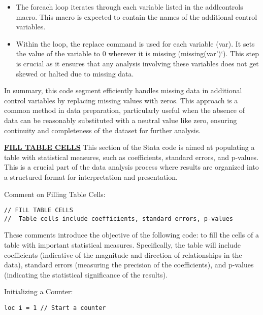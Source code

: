 \documentclass{article}
\begin{document}
\begin{itemize}
    \item 	The foreach loop iterates through each variable listed in the addlcontrols macro. This macro is expected to contain the names of the additional control variables.
    \item Within the loop, the replace command is used for each variable (var). It sets the value of the variable to 0 wherever it is missing (missing(var')`). This step is crucial as it ensures that any analysis involving these variables does not get skewed or halted due to missing data.
\end{itemize}
\vspace{0.3cm}In summary, this code segment efficiently handles missing data in additional control variables by replacing missing values with zeros. This approach is a common method in data preparation, particularly useful when the absence of data can be reasonably substituted with a neutral value like zero, ensuring continuity and completeness of the dataset for further analysis.

\underline{\textbf{FILL TABLE CELLS}}
\vspace{0.3cm}This section of the Stata code is aimed at populating a table with statistical measures, such as coefficients, standard errors, and p-values. This is a crucial part of the data analysis process where results are organized into a structured format for interpretation and presentation. \newline

Comment on Filling Table Cells:
\begin{mdframed}
\begin{verbatim}
// FILL TABLE CELLS 
//	Table cells include coefficients, standard errors, p-values
\end{verbatim}
\end{mdframed}

\vspace{0.3cm}These comments introduce the objective of the following code: to fill the cells of a table with important statistical measures. Specifically, the table will include coefficients (indicative of the magnitude and direction of relationships in the data), standard errors (measuring the precision of the coefficients), and p-values (indicating the statistical significance of the results).\newline


Initializing a Counter:

\begin{mdframed}
\begin{verbatim}
loc i = 1 // Start a counter
\end{verbatim}
\end{mdframed}
\end{document}
